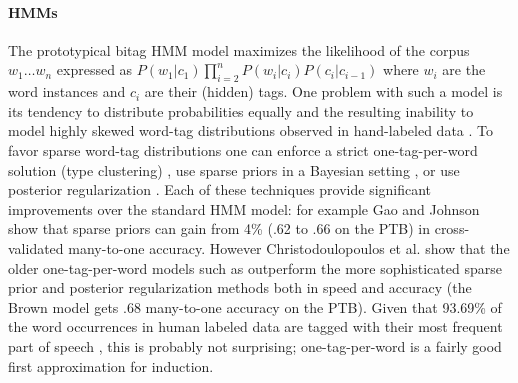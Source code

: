 \paragraph{HMMs}
The prototypical bitag HMM model maximizes the likelihood of the
corpus $w_1 \ldots w_n$ expressed as $P(w_1|c_1)\prod_{i=2}^n
P(w_i|c_i) P(c_i|c_{i-1})$ where $w_i$ are the word instances and $c_i$
are their (hidden) tags.  One problem with such a model is its
tendency to distribute probabilities equally and the resulting
inability to model highly skewed word-tag distributions observed in
hand-labeled data \cite{johnson:2007:EMNLP-CoNLL2007}.  To favor
sparse word-tag distributions one can enforce a strict
one-tag-per-word solution (type clustering)
\cite{Brown:1992:CNG:176313.176316,Clark:2003:CDM:1067807.1067817},
use sparse priors in a Bayesian setting
\cite{goldwater-griffiths:2007:ACLMain,johnson:2007:EMNLP-CoNLL2007},
or use posterior regularization
\cite{Ganchev:2010:PRS:1859890.1859918}.  Each of these techniques
provide significant improvements over the standard HMM model: for
example Gao and Johnson  show
that sparse priors can gain from 4\% (.62 to .66 on the PTB) in
cross-validated many-to-one accuracy.  However Christodoulopoulos et
al.  show that
the older one-tag-per-word models such as
\cite{Brown:1992:CNG:176313.176316} outperform the more sophisticated
sparse prior and posterior regularization methods both in speed and
accuracy (the Brown model gets .68 many-to-one accuracy on the PTB).
Given that 93.69\% of the word occurrences in human labeled data are
tagged with their most frequent part of speech
\cite{Toutanova:2003:FPT:1073445.1073478}, this is probably not
surprising; one-tag-per-word is a fairly good first approximation for
induction.


